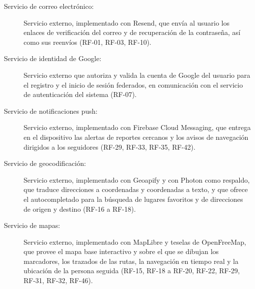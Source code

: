 \begin{description}
    \item[Servicio de correo electrónico:] Servicio externo, implementado con Resend, que envía al usuario los enlaces de verificación del correo y de recuperación de la contraseña, así como sus reenvíos (RF-01, RF-03, RF-10).

    \item[Servicio de identidad de Google:] Servicio externo que autoriza y valida la cuenta de Google del usuario para el registro y el inicio de sesión federados, en comunicación con el servicio de autenticación del sistema (RF-07).

    \item[Servicio de notificaciones push:] Servicio externo, implementado con Firebase Cloud Messaging, que entrega en el dispositivo las alertas de reportes cercanos y los avisos de navegación dirigidos a los seguidores (RF-29, RF-33, RF-35, RF-42).

    \item[Servicio de geocodificación:] Servicio externo, implementado con Geoapify y con Photon como respaldo, que traduce direcciones a coordenadas y coordenadas a texto, y que ofrece el autocompletado para la búsqueda de lugares favoritos y de direcciones de origen y destino (RF-16 a RF-18).

    \item[Servicio de mapas:] Servicio externo, implementado con MapLibre y teselas de OpenFreeMap, que provee el mapa base interactivo y sobre el que se dibujan los marcadores, los trazados de las rutas, la navegación en tiempo real y la ubicación de la persona seguida (\mbox{RF-15}, \mbox{RF-18} a \mbox{RF-20}, \mbox{RF-22}, \mbox{RF-29}, \mbox{RF-31}, \mbox{RF-32}, \mbox{RF-46}).
\end{description}

